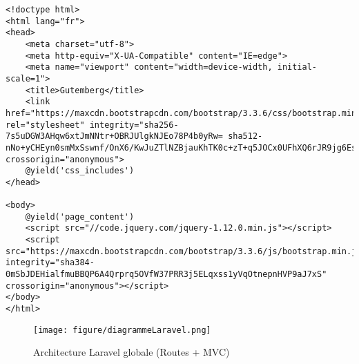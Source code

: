 \begin{lstlisting}
<!doctype html>
<html lang="fr">
<head>
	<meta charset="utf-8">
	<meta http-equiv="X-UA-Compatible" content="IE=edge">
	<meta name="viewport" content="width=device-width, initial-scale=1">
	<title>Gutemberg</title>
	<link href="https://maxcdn.bootstrapcdn.com/bootstrap/3.3.6/css/bootstrap.min.css" rel="stylesheet" integrity="sha256-7s5uDGW3AHqw6xtJmNNtr+OBRJUlgkNJEo78P4b0yRw= sha512-nNo+yCHEyn0smMxSswnf/OnX6/KwJuZTlNZBjauKhTK0c+zT+q5JOCx0UFhXQ6rJR9jg6Es8gPuD2uZcYDLqSw==" crossorigin="anonymous">
	@yield('css_includes')
</head>

<body>
	@yield('page_content')
	<script src="//code.jquery.com/jquery-1.12.0.min.js"></script>
	<script src="https://maxcdn.bootstrapcdn.com/bootstrap/3.3.6/js/bootstrap.min.js" integrity="sha384-0mSbJDEHialfmuBBQP6A4Qrprq5OVfW37PRR3j5ELqxss1yVqOtnepnHVP9aJ7xS" crossorigin="anonymous"></script>
</body>
</html>
\end{lstlisting}

\begin{figure}[H]
        \centering
        \texttt{[image: figure/diagrammeLaravel.png]}
            \caption{Architecture Laravel globale (Routes + MVC)}
            \label{archiLaravel}
\end{figure}